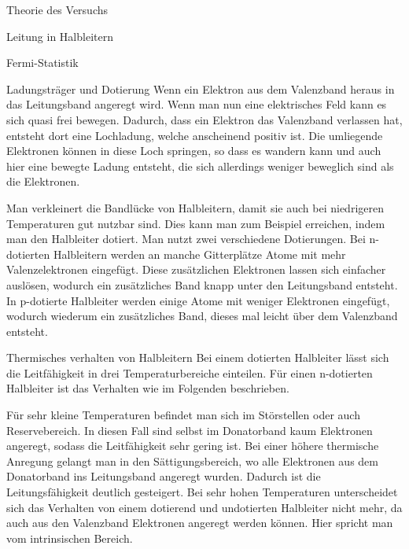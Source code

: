 \documentclass[pdftex, a4paper,11pt, twoside, ngerman]{report}
\begin{document}
\begin{chapter}{Theorie des Versuchs}
\begin{section}{Leitung in Halbleitern}
\begin{subsection}{Fermi-Statistik}
        \end{subsection}

        \begin{subsection}{Ladungsträger und Dotierung}
            Wenn ein Elektron aus dem Valenzband heraus in das Leitungsband angeregt wird.
            Wenn man nun eine elektrisches Feld kann es sich quasi frei bewegen.
            Dadurch, dass ein Elektron das Valenzband verlassen hat, entsteht dort eine Lochladung, welche anscheinend positiv ist. 
            Die umliegende Elektronen können in diese Loch springen, so dass es wandern kann und auch hier eine bewegte Ladung entsteht, die sich allerdings weniger beweglich sind als die Elektronen.

            Man verkleinert die Bandlücke von Halbleitern, damit sie auch bei niedrigeren Temperaturen gut nutzbar sind.
            Dies kann man zum Beispiel erreichen, indem man den Halbleiter dotiert.
            Man nutzt zwei verschiedene Dotierungen. 
            Bei n-dotierten Halbleitern werden an manche Gitterplätze Atome mit mehr Valenzelektronen eingefügt.
            Diese zusätzlichen Elektronen lassen sich einfacher auslösen, wodurch ein zusätzliches Band knapp unter den Leitungsband entsteht.
            In p-dotierte Halbleiter werden einige Atome mit weniger Elektronen eingefügt, wodurch wiederum ein zusätzliches Band, dieses mal leicht über dem Valenzband entsteht.

        \end{subsection}

        \begin{subsection}{Thermisches verhalten von Halbleitern}
            Bei einem dotierten Halbleiter lässt sich die Leitfähigkeit in drei Temperaturbereiche einteilen.
            Für einen n-dotierten Halbleiter ist das Verhalten wie im Folgenden beschrieben.

            Für sehr kleine Temperaturen befindet man sich im Störstellen oder auch Reservebereich. In diesen Fall sind selbst im Donatorband kaum Elektronen angeregt, sodass die Leitfähigkeit sehr gering ist.
            Bei einer höhere thermische Anregung gelangt man in den Sättigungsbereich, wo alle Elektronen aus dem Donatorband ins Leitungsband angeregt wurden.
            Dadurch ist die Leitungsfähigkeit deutlich gesteigert.
            Bei sehr hohen Temperaturen unterscheidet sich das Verhalten von einem dotierend und undotierten Halbleiter nicht mehr, da auch aus den Valenzband Elektronen angeregt werden können.
            Hier spricht man vom intrinsischen Bereich.


\end{subsection}
\end{section}
\end{chapter}
\end{document}
